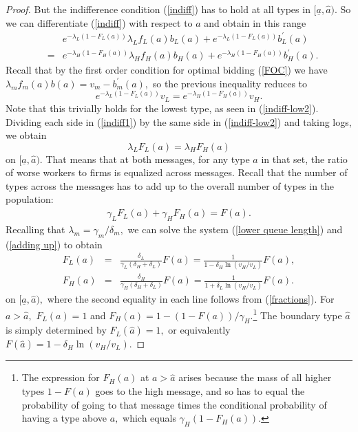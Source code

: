 \documentclass[12pt]{article}
\begin{document}
\begin{proof}
But the indifference condition (\ref{indiff}) has to hold at all types in $[\underline{a},\hat{a}).$
So we can differentiate (\ref{indiff}) with respect to $a$ and obtain in this range
\begin{eqnarray*}
&&e^{-\lambda _{L}(1-F_{L}(a))}\lambda _{L}f_{L}(a)b_{L}(a)+e^{-\lambda
_{L}(1-F_{L}(a))}b_{L}^{\prime }(a) \\
&=&e^{-\lambda _{H}(1-F_{H}(a))}\lambda _{H}f_{H}(a)b_{H}(a)+e^{-\lambda
_{H}(1-F_{H}(a))}b_{H}^{\prime }(a).
\end{eqnarray*}%
Recall that by the first order condition for optimal bidding (\ref{FOC}) we have $\lambda _{m}f_{m}(a)b(a)=v_{m}-b_{m}^{\prime }(a),$ so the previous inequality reduces to
\begin{equation}
e^{-\lambda _{L}(1-F_{L}(a))}v_{L}=e^{-\lambda _{H}(1-F_{H}(a))}v_{H}.
\label{indiff1}
\end{equation}%
Note that this trivially holds for the lowest type, as seen in (\ref{indiff-low2}).
Dividing each side in (\ref{indiff1}) by the same side in (\ref{indiff-low2}) and taking logs, we obtain
\begin{equation}
\lambda _{L}F_{L}(a)=\lambda _{H}F_{H}(a)  \label{lower queue length}
\end{equation}%
on $[\underline{a},\hat{a}).$
That means that at both messages, for any type  $a$ in that set, the ratio of worse workers to firms is equalized across messages.
Recall that the number of types across the messages has to add up to the overall number of types in the population:
\begin{align}
\gamma _{L}F_{L}(a)+\gamma _{H}F_{H}(a)=F(a).  \label{adding up}
\end{align}
Recalling that $\lambda _{m}=\gamma _{m}/\delta _{m},$ we can solve the system (\ref{lower queue length}) and (\ref{adding up}) to obtain
\begin{eqnarray}
F_{L}(a) &=&\frac{\delta _{L}}{\gamma _{L}(\delta _{H}+\delta _{L})}F(a)=%
\frac{1}{1-\delta _{H}\ln (v_{H}/v_{L})}F(a),  \label{distribution} \\
F_{H}(a) &=&\frac{\delta _{H}}{\gamma _{H}(\delta _{H}+\delta _{L})}F(a)=%
\frac{1}{1+\delta _{L}\ln (v_{H}/v_{L})}F(a).  \nonumber
\end{eqnarray}%
on $[\underline{a},\hat{a}),$ where the second equality in each line follows from (\ref{fractions}).
For $a>\hat{a},$ $F_{L}(a)=1$ and $F_{H}(a)=1-(1-F(a))/\gamma _{H}$.\footnote{%
  The expression for $F_{H}(a)$ at $a>\hat{a}$ arises because the mass of all higher types $1-F(a)$ goes to the high message, and so has to equal the probability of going to that message times the conditional probability of having a type above $a,$ which equals $\gamma _{H}(1-F_{H}(a)).$
  }
The boundary type $\hat{a}$ is simply determined by $F_{L}(\hat{a})=1,$ or equivalently $F(\hat{a})=1-\delta _{H}\ln (v_{H}/v_{L}).$


\end{proof}
\end{document}
